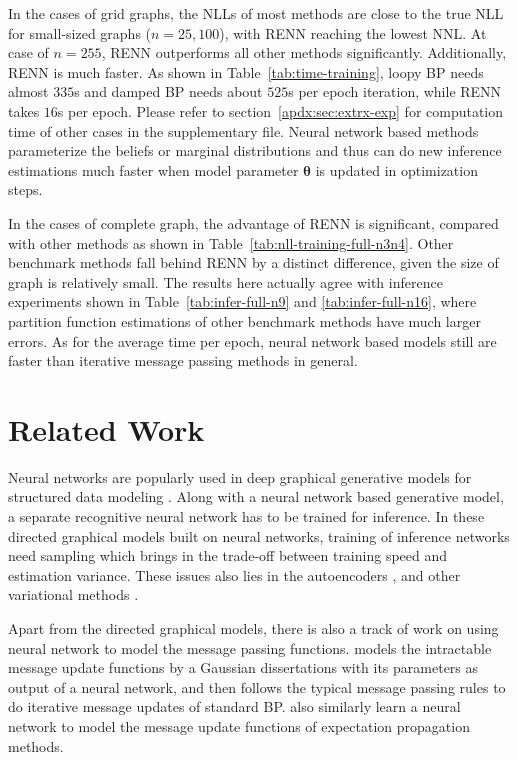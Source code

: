 In the cases of grid graphs, the NLLs of most methods are close to the true NLL for small-sized graphs ($n=25,100$), with RENN reaching the lowest NNL. At case of $n=255$, RENN outperforms all other methods significantly. Additionally, RENN is much faster. As shown in Table~\ref{tab:time-training}, loopy BP needs almost $335$s and damped BP needs about $525$s per epoch iteration, while RENN takes $16$s per epoch. Please refer to section~\ref{apdx:sec:extrx-exp} for computation time of other cases in the supplementary file.
Neural network based methods parameterize the beliefs or marginal distributions and thus can do new inference estimations much faster when model parameter $\bm{\theta}$ is updated in optimization steps. %



In the cases of complete graph, the advantage of RENN is significant, compared with other methods as shown in Table~\ref{tab:nll-training-full-n3n4}. Other benchmark methods fall behind RENN by a distinct difference, given the size of graph is relatively small. The results here actually agree with inference experiments shown in Table~\ref{tab:infer-full-n9} and \ref{tab:infer-full-n16}, where partition function estimations of other benchmark methods have much larger errors. As for the average time per epoch, neural network based models still are faster than iterative message passing methods in general.

\section{Related Work}


Neural networks are popularly used in deep graphical generative models for structured data modeling \cite{qu2019gmnn, johansonNIPS2016_6379, li2018graphical}. Along with a neural network based generative model, a separate recognitive neural network has to be trained for inference. In these directed graphical models built on neural networks, training of inference networks need sampling which brings in the trade-off between training speed and estimation variance. These issues also lies in the autoencoders \cite{DBLP:journals/corr/KingmaW13,2017arXiv170104722M}, and other variational methods \cite{kuleshov2017neural_variational,NIPS2017_7136}.

Apart from the directed graphical models, there is also a track of work on using neural network to model the message passing functions. \cite{akbayrak2019reparameterization} models the intractable message update functions by a Gaussian dissertations with its parameters as output of a neural network, and then follows the typical message passing rules to do iterative message updates of standard BP. \cite{jitkrittum2015kernel, heess2013learning} also similarly learn a neural network to model the message update functions of expectation propagation methods.



